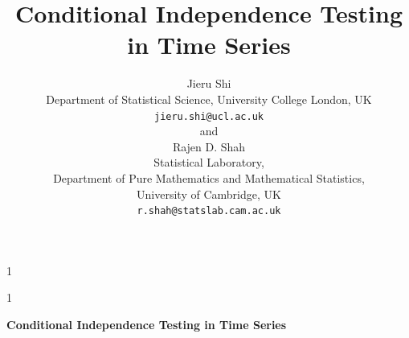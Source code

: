 \documentclass[12pt]{article}
\numberwithin{equation}{section}
\newcommand{\blind}{1}
\begin{document}
%


\def\spacingset#1{\renewcommand{\baselinestretch}%
{#1}\small\normalsize}

\spacingset{1}

\blind
{
  \title{\bf Conditional Independence Testing in Time Series}

  \author{
    Jieru Shi\\
    Department of Statistical Science, University College London, UK\\
    \texttt{jieru.shi@ucl.ac.uk}\\[0.8em]
    and\\[0.8em]
    Rajen D. Shah\\
Statistical Laboratory,\\
Department of Pure Mathematics and Mathematical Statistics,\\
University of Cambridge, UK\\
\texttt{r.shah@statslab.cam.ac.uk}
  }

  \date{}
  \maketitle
}
\fi

\blind
{
  \bigskip
  \bigskip
  \bigskip
  \begin{center}
    {\LARGE\bf Conditional Independence Testing in Time Series}
  \end{center}
  \medskip
}
\fi
\end{document}
